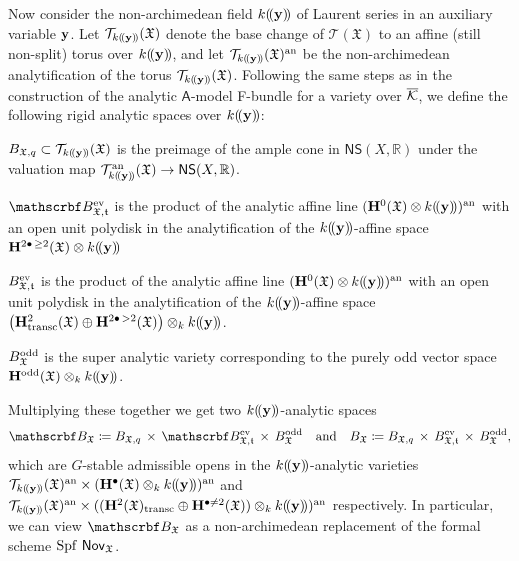 \documentclass[twoside,leqno]{article}
\numberwithin{equation}{section}
\theoremstyle{plain}
\theoremstyle{definition}
\begin{document}
Now consider the non-archimedean field $k(\!(\mathbf{y})\!)$ of
Laurent series in an auxiliary variable $\mathbf{y}$. Let
$\mathcal{T}_{k(\!(\mathbf{y})\!)}(\mathfrak{X})$ denote the base change of
$\mathcal{T}(\mathfrak{X})$ to an affine (still non-split) torus over
$k(\!(\mathbf{y})\!)$, and let
$\mathcal{T}_{k(\!(\mathbf{y})\!)}(\mathfrak{X})^{\operatorname{an}}$ be the non-archimedean
analytification of the torus
$\mathcal{T}_{k(\!(\mathbf{y})\!)}(\mathfrak{X})$. Following the same steps as in the
construction of the analytic $\mathsf{A}$-model F-bundle for a variety
over $\overline{\mathcal K}$, we define the following rigid analytic spaces over
$k(\!(\mathbf{y})\!)$:
\begin{description}
\item $B_{\mathfrak{X},q} \subset
  \mathcal{T}_{k(\!(\mathbf{y})\!)}(\mathfrak{X})$ is the preimage of the ample cone
  in $\mathsf{NS}(X,\mathbb{R})$ under the valuation map
  $\mathcal{T}_{k(\!(\mathbf{y})\!)}^{\operatorname{an}}(\mathfrak{X}) \to
  \mathsf{NS}(X,\mathbb{R})$.
\item $\omB_{\mathfrak{X,t}}^{\even}$ is the product of the
  analytic affine line $(\mathbf{H}^{0}(\mathfrak{X})\otimes
  k(\!(\mathbf{y})\!))^{\operatorname{an}}$
  with an open unit polydisk in the
  analytification of the $k(\!(\mathbf{y})\!)$-affine space
$\mathbf{H}^{2\bullet \, \geq 2}(\mathfrak{X})
  \otimes k(\!(\mathbf{y})\!)$
\item $B_{\mathfrak{X,t}}^{\mathrm{ev}}$ is the product of the analytic
  affine line $(\mathbf{H}^{0}(\mathfrak{X})\otimes
  k(\!(\mathbf{y})\!))^{\operatorname{an}}$ with an open unit polydisk in the
  analytification of the $k(\!(\mathbf{y})\!)$-affine space
  $\left(\mathbf{H}^{2}_{\operatorname{transc}}(\mathfrak{X})\oplus
  \mathbf{H}^{2\bullet\, >2}(\mathfrak{X})\right) \otimes_{k} k(\!(\mathbf{y})\!)$.
\item $B_{\mathfrak{X}}^{\mathrm{odd}}$ is the super analytic variety
  corresponding to the purely odd vector space \linebreak
  $\mathbf{H}^{\mathrm{odd}}(\mathfrak{X})\otimes_{k} k(\!(\mathbf{y})\!)$.
\end{description}
Multiplying these together we get two $k(\!(\mathbf{y})\!)$-analytic spaces 
\[
\omB_{\mathfrak{X}} \coloneqq B_{\mathfrak{X},q} \, \times \,
\omB_{\mathfrak{X,t}}^{\even} \, \times \, B_{\mathfrak{X}}^{\odd}
\quad \text{and} \quad B_{\mathfrak{X}} \coloneqq B_{\mathfrak{X},q} \,
\times \, B_{\mathfrak{X,t}}^{\even} \, \times \,
B_{\mathfrak{X}}^{\odd},
\]
which are $G$-stable admissible opens in the $k(\!(\mathbf{y})\!)$-analytic varieties
$\mathcal{T}_{k(\!(\mathbf{y})\!)}(\mathfrak{X})^{\operatorname{an}}\times
(\mathbf{H}^{\bullet}(\mathfrak{X})\otimes_{k} k(\!(\mathbf{y})\!))^{\operatorname{an}}$ and
$\mathcal{T}_{k(\!(\mathbf{y})\!)}(\mathfrak{X})^{\operatorname{an}}\times ((\mathbf{H}^{2}(\mathfrak{X})_{\operatorname{transc}}\oplus \mathbf{H}^{\bullet\neq 2}(\mathfrak{X}))\otimes_{k} k(\!(\mathbf{y})\!))^{\operatorname{an}}$
respectively.  In particular, we can view $\omB_{\mathfrak{X}}$ as a
non-archimedean replacement of the formal scheme $\operatorname{Spf}\,
\mathsf{Nov}_{\mathfrak{X}}$.
\end{document}
